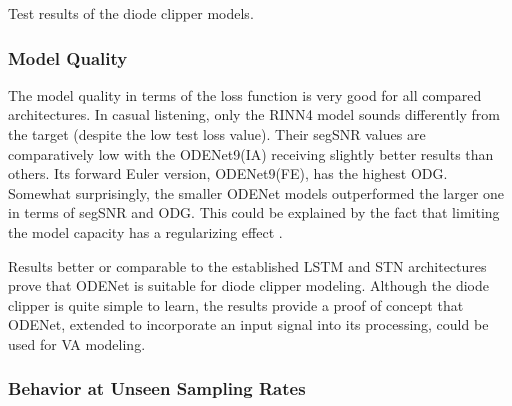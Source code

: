 
\begin{table}[]
    \caption{Test results of the diode clipper models.}
    
    \label{tab:diode_clipper_results}
\end{table}

\subsubsection{Model Quality}

The model quality in terms of the loss function is very good for all compared architectures. In casual listening, only the \ac{RINN}4 model sounds differently from the target (despite the low test loss value). Their \ac{segSNR} values are comparatively low with the ODENet9(IA) receiving slightly better results than others. Its forward Euler version, ODENet9(FE), has the highest \ac{ODG}. Somewhat surprisingly, the smaller ODENet models outperformed the larger one in terms of \ac{segSNR} and \ac{ODG}. This could be explained by the fact that limiting the model capacity has a regularizing effect \cite{Goodfellow-et-al-2016}.

Results better or comparable to the established \ac{LSTM} and \ac{STN} architectures prove that ODENet is suitable for diode clipper modeling. Although the diode clipper is quite simple to learn, the results provide a proof of concept that ODENet, extended to incorporate an input signal into its processing, could be used for \ac{VA} modeling.

\subsubsection{Behavior at Unseen Sampling Rates}

